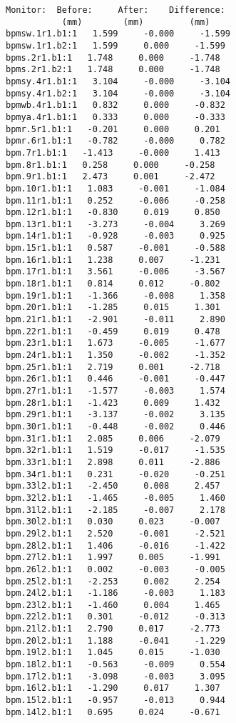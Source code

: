 \begin{verbatim}
Monitor:  Before:     After:    Difference:
           (mm)        (mm)         (mm)   
bpmsw.1r1.b1:1   1.599     -0.000     -1.599
bpmsw.1r1.b2:1   1.599     0.000     -1.599
bpms.2r1.b1:1   1.748     0.000     -1.748
bpms.2r1.b2:1   1.748     0.000     -1.748
bpmsy.4r1.b1:1   3.104     -0.000     -3.104
bpmsy.4r1.b2:1   3.104     -0.000     -3.104
bpmwb.4r1.b1:1   0.832     0.000     -0.832
bpmya.4r1.b1:1   0.333     0.000     -0.333
bpmr.5r1.b1:1   -0.201     0.000     0.201
bpmr.6r1.b1:1   -0.782     -0.000     0.782
bpm.7r1.b1:1   -1.413     -0.000     1.413
bpm.8r1.b1:1   0.258     0.000     -0.258
bpm.9r1.b1:1   2.473     0.001     -2.472
bpm.10r1.b1:1   1.083     -0.001     -1.084
bpm.11r1.b1:1   0.252     -0.006     -0.258
bpm.12r1.b1:1   -0.830     0.019     0.850
bpm.13r1.b1:1   -3.273     -0.004     3.269
bpm.14r1.b1:1   -0.928     -0.003     0.925
bpm.15r1.b1:1   0.587     -0.001     -0.588
bpm.16r1.b1:1   1.238     0.007     -1.231
bpm.17r1.b1:1   3.561     -0.006     -3.567
bpm.18r1.b1:1   0.814     0.012     -0.802
bpm.19r1.b1:1   -1.366     -0.008     1.358
bpm.20r1.b1:1   -1.285     0.015     1.301
bpm.21r1.b1:1   -2.901     -0.011     2.890
bpm.22r1.b1:1   -0.459     0.019     0.478
bpm.23r1.b1:1   1.673     -0.005     -1.677
bpm.24r1.b1:1   1.350     -0.002     -1.352
bpm.25r1.b1:1   2.719     0.001     -2.718
bpm.26r1.b1:1   0.446     -0.001     -0.447
bpm.27r1.b1:1   -1.577     -0.003     1.574
bpm.28r1.b1:1   -1.423     0.009     1.432
bpm.29r1.b1:1   -3.137     -0.002     3.135
bpm.30r1.b1:1   -0.448     -0.002     0.446
bpm.31r1.b1:1   2.085     0.006     -2.079
bpm.32r1.b1:1   1.519     -0.017     -1.535
bpm.33r1.b1:1   2.898     0.011     -2.886
bpm.34r1.b1:1   0.231     -0.020     -0.251
bpm.33l2.b1:1   -2.450     0.008     2.457
bpm.32l2.b1:1   -1.465     -0.005     1.460
bpm.31l2.b1:1   -2.185     -0.007     2.178
bpm.30l2.b1:1   0.030     0.023     -0.007
bpm.29l2.b1:1   2.520     -0.001     -2.521
bpm.28l2.b1:1   1.406     -0.016     -1.422
bpm.27l2.b1:1   1.997     0.005     -1.991
bpm.26l2.b1:1   0.002     -0.003     -0.005
bpm.25l2.b1:1   -2.253     0.002     2.254
bpm.24l2.b1:1   -1.186     -0.003     1.183
bpm.23l2.b1:1   -1.460     0.004     1.465
bpm.22l2.b1:1   0.301     -0.012     -0.313
bpm.21l2.b1:1   2.790     0.017     -2.773
bpm.20l2.b1:1   1.188     -0.041     -1.229
bpm.19l2.b1:1   1.045     0.015     -1.030
bpm.18l2.b1:1   -0.563     -0.009     0.554
bpm.17l2.b1:1   -3.098     -0.003     3.095
bpm.16l2.b1:1   -1.290     0.017     1.307
bpm.15l2.b1:1   -0.957     -0.013     0.944
bpm.14l2.b1:1   0.695     0.024     -0.671

\end{verbatim}

